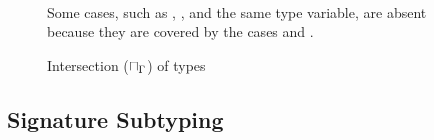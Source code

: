 \begin{figure}
{\begin{minipage}{\ruleswidth}
\[\begin{array}{ccccll}
\end{array}
\]
\end{minipage}}
\caption{Intersection ($\sqcap_{\Gamma}$) of types}\label{fig:ty-join-meet}
\begin{tablenotes}[para]
\small
Some cases, such as \tybot, \tyany, and the same type variable,
are absent because they are covered by the cases  and 
.
\end{tablenotes}
\end{figure}

\subsection{Signature Subtyping}%
\label{subsec:dec-sub:subtysig}

